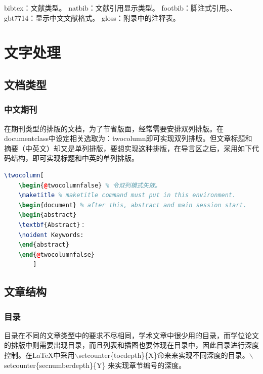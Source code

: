 \documentclass[12pt]{book}
\begin{document}
bibtex：文献类型。
natbib：文献引用显示类型。
footbib：脚注式引用。、
gbt7714：显示中文文献格式。
gloss：附录中的注释表。


\chapter{文字处理}

\section{文档类型}

\subsection{中文期刊}

在期刊类型的排版的文档，为了节省版面，经常需要安排双列排版。在documentclass中设定相关选取为：twocolumn即可实现双列排版。但文章标题和摘要（中英文）却又是单列排版，要想实现这种排版，在导言区之后，采用如下代码结构，即可实现标题和中英的单列排版。

\begin{lstlisting}[language=tex,breaklines]
	\twocolumn[
	\begin{@twocolumnfalse} % 令双列模式失效。
	\maketitle % maketitle command must put in this environment.
	\begin{document} % after this, abstract and main session start.
	\begin{abstract}
	\textbf{Abstract}：
	\noident Keywords:
	\end{abstract}
	\end{@twocolumnfalse}
		]	
\end{lstlisting}

\section{文章结构}


\subsection{目录}

目录在不同的文章类型中的要求不尽相同，学术文章中很少用的目录，而学位论文的排版中则需要出现目录，而且列表和插图也要体现在目录中，因此目录进行深度控制。在\LaTeX{}中采用$\backslash$setcounter\{tocdepth\}\{X\}命来来实现不同深度的目录。$\backslash$setcounter\{secnumberdepth\}\{Y\} 来实现章节编号的深度。
\end{document}
